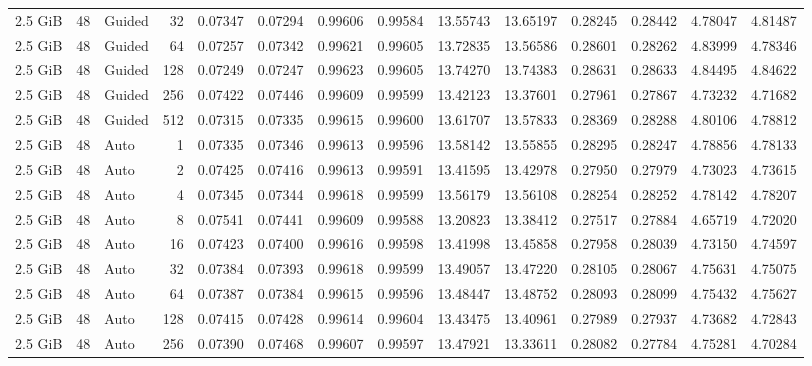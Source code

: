 \begin{table}[H]
\begin{adjustbox}{width=\textwidth, keepaspectratio}
\begin{tabular}{rrlrrrrrrrrrrr}
                    2.5 GiB & 48 & Guided & 32 & 0.07347 & 0.07294 & 0.99606 & 0.99584 & 13.55743 & 13.65197 & 0.28245 & 0.28442 & 4.78047 & 4.81487 \\
                    2.5 GiB & 48 & Guided & 64 & 0.07257 & 0.07342 & 0.99621 & 0.99605 & 13.72835 & 13.56586 & 0.28601 & 0.28262 & 4.83999 & 4.78346 \\
                    2.5 GiB & 48 & Guided & 128 & 0.07249 & 0.07247 & 0.99623 & 0.99605 & 13.74270 & 13.74383 & 0.28631 & 0.28633 & 4.84495 & 4.84622 \\
                    2.5 GiB & 48 & Guided & 256 & 0.07422 & 0.07446 & 0.99609 & 0.99599 & 13.42123 & 13.37601 & 0.27961 & 0.27867 & 4.73232 & 4.71682 \\
                    2.5 GiB & 48 & Guided & 512 & 0.07315 & 0.07335 & 0.99615 & 0.99600 & 13.61707 & 13.57833 & 0.28369 & 0.28288 & 4.80106 & 4.78812 \\
                    2.5 GiB & 48 & Auto & 1 & 0.07335 & 0.07346 & 0.99613 & 0.99596 & 13.58142 & 13.55855 & 0.28295 & 0.28247 & 4.78856 & 4.78133 \\
                    2.5 GiB & 48 & Auto & 2 & 0.07425 & 0.07416 & 0.99613 & 0.99591 & 13.41595 & 13.42978 & 0.27950 & 0.27979 & 4.73023 & 4.73615 \\
                    2.5 GiB & 48 & Auto & 4 & 0.07345 & 0.07344 & 0.99618 & 0.99599 & 13.56179 & 13.56108 & 0.28254 & 0.28252 & 4.78142 & 4.78207 \\
                    2.5 GiB & 48 & Auto & 8 & 0.07541 & 0.07441 & 0.99609 & 0.99588 & 13.20823 & 13.38412 & 0.27517 & 0.27884 & 4.65719 & 4.72020 \\
                    2.5 GiB & 48 & Auto & 16 & 0.07423 & 0.07400 & 0.99616 & 0.99598 & 13.41998 & 13.45858 & 0.27958 & 0.28039 & 4.73150 & 4.74597 \\
                    2.5 GiB & 48 & Auto & 32 & 0.07384 & 0.07393 & 0.99618 & 0.99599 & 13.49057 & 13.47220 & 0.28105 & 0.28067 & 4.75631 & 4.75075 \\
                    2.5 GiB & 48 & Auto & 64 & 0.07387 & 0.07384 & 0.99615 & 0.99596 & 13.48447 & 13.48752 & 0.28093 & 0.28099 & 4.75432 & 4.75627 \\
                    2.5 GiB & 48 & Auto & 128 & 0.07415 & 0.07428 & 0.99614 & 0.99604 & 13.43475 & 13.40961 & 0.27989 & 0.27937 & 4.73682 & 4.72843 \\
                    2.5 GiB & 48 & Auto & 256 & 0.07390 & 0.07468 & 0.99607 & 0.99597 & 13.47921 & 13.33611 & 0.28082 & 0.27784 & 4.75281 & 4.70284 \\

\end{tabular}
\end{adjustbox}
\end{table}
